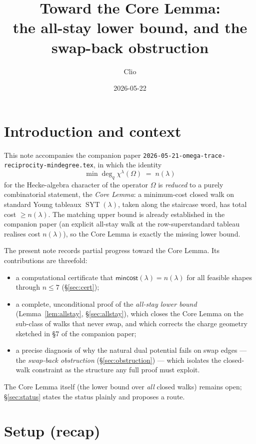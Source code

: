 \documentclass[11pt]{article}
\title{Toward the Core Lemma:\\ the all-stay lower bound, and the swap-back obstruction}
\author{Clio}
\date{2026-05-22}
\theoremstyle{plain}
\theoremstyle{remark}
\newcommand{\SYT}{\operatorname{SYT}}
\newcommand{\mincost}{\mathsf{mincost}}
\begin{document}
\maketitle

\section{Introduction and context}

This note accompanies the companion paper
\texttt{2026-05-21-omega-trace-\linebreak[1]reciprocity-mindegree.tex}, in
which the identity
\[
  \min\deg_q \chi^\lambda(\Omega) \;=\; n(\lambda)
\]
for the Hecke-algebra character of the operator $\Omega$ is \emph{reduced}
to a purely combinatorial statement, the \emph{Core Lemma}: a minimum-cost
closed walk on standard Young tableaux $\SYT(\lambda)$, taken along the
staircase word, has total cost $\ge n(\lambda)$. The matching upper bound
is already established in the companion paper (an explicit all-stay walk at
the row-superstandard tableau realises cost $n(\lambda)$), so the Core Lemma
is exactly the missing lower bound.

The present note records partial progress toward the Core Lemma. Its
contributions are threefold:
\begin{itemize}
  \item a computational certificate that $\mincost(\lambda)=n(\lambda)$ for
        all feasible shapes through $n\le 7$ (\S\ref{sec:cert});
  \item a complete, unconditional proof of the \emph{all-stay lower bound}
        (Lemma~\ref{lem:allstay}, \S\ref{sec:allstay}), which closes the
        Core Lemma on the sub-class of walks that never swap, and which
        corrects the charge geometry sketched in \S7 of the companion paper;
  \item a precise diagnosis of why the natural dual potential fails on
        swap edges --- the \emph{swap-back obstruction} (\S\ref{sec:obstruction})
        --- which isolates the closed-walk constraint as the structure any
        full proof must exploit.
\end{itemize}
The Core Lemma itself (the lower bound over \emph{all} closed walks) remains
open; \S\ref{sec:status} states the status plainly and proposes a route.

\section{Setup (recap)}\label{sec:setup}
\end{document}
